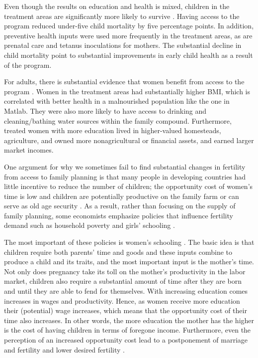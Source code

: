 \documentclass[]{article}
\begin{document}
Even though the results on education and health is mixed, children in the treatment areas are significantly more likely to survive \citep{Joshi2007}. Having access to the program reduced under-five child mortality by five percentage points. In addition, preventive health inputs were used more frequently in the treatment areas, as are prenatal care and tetanus inoculations for mothers. The substantial decline in child mortality point to substantial improvements in early child health as a result of the program.

For adults, there is substantial evidence that women benefit from access to the program \citep{Joshi2007}. Women in the treatment areas had substantially higher BMI, which is correlated with better health in a malnourished population like the one in Matlab. They were also more likely to have access to drinking and cleaning/bathing water sources within the family compound. Furthermore, treated women with more education lived in higher-valued homesteads, agriculture, and owned more nonagricultural or financial assets, and earned larger market incomes.

One argument for why we sometimes fail to find substantial changes in fertility from access to family planning is that many people in developing countries had little incentive to reduce the number of children; the opportunity cost of women's time is low and children are potentially productive on the family farm or can serve as old age security \citep{Banerjee2014,Lambert2016}. As a result, rather than focusing on the supply of family planning, some economists emphasize policies that influence fertility demand such as household poverty and girls' schooling \citep{pritchett94a,DasGupta2011}.

The most important of these policies is women's schooling \citep{schultz02}. The basic idea is that children require both parents' time and goods and these inputs combine to produce a child and its traits, and the most important input is the mother's time. Not only does pregnancy take its toll on the mother's productivity in the labor market, children also require a substantial amount of time after they are born and until they are able to fend for themselves. With increasing education comes increases in wages and productivity. Hence, as women receive more education their (potential) wage increases, which means that the opportunity cost of their time also increases. In other words, the more education the mother has the higher is the cost of having children in terms of foregone income. Furthermore, even the perception of an increased opportunity cost lead to a postponement of marriage and fertility and lower desired fertility \citep{Jensen2012}.
\end{document}
